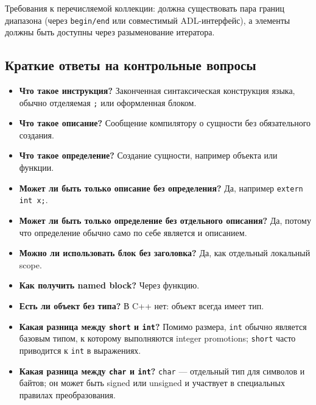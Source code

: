 Требования к перечисляемой коллекции: должна существовать пара границ диапазона (через \texttt{begin/end} или совместимый ADL-интерфейс), а элементы должны быть доступны через разыменование итератора.

\subsection{Краткие ответы на контрольные вопросы}
\begin{itemize}
    \item \textbf{Что такое инструкция?} Законченная синтаксическая конструкция языка, обычно отделяемая \texttt{;} или оформленная блоком.
    \item \textbf{Что такое описание?} Сообщение компилятору о сущности без обязательного создания.
    \item \textbf{Что такое определение?} Создание сущности, например объекта или функции.
    \item \textbf{Может ли быть только описание без определения?} Да, например \texttt{extern int x;}.
    \item \textbf{Может ли быть только определение без отдельного описания?} Да, потому что определение обычно само по себе является и описанием.
    \item \textbf{Можно ли использовать блок без заголовка?} Да, как отдельный локальный scope.
    \item \textbf{Как получить named block?} Через функцию.
    \item \textbf{Есть ли объект без типа?} В C++ нет: объект всегда имеет тип.
    \item \textbf{Какая разница между \texttt{short} и \texttt{int}?} Помимо размера, \texttt{int} обычно является базовым типом, к которому выполняются integer promotions; \texttt{short} часто приводится к \texttt{int} в выражениях.
    \item \textbf{Какая разница между \texttt{char} и \texttt{int}?} \texttt{char} — отдельный тип для символов и байтов; он может быть signed или unsigned и участвует в специальных правилах преобразования.
\end{itemize}
